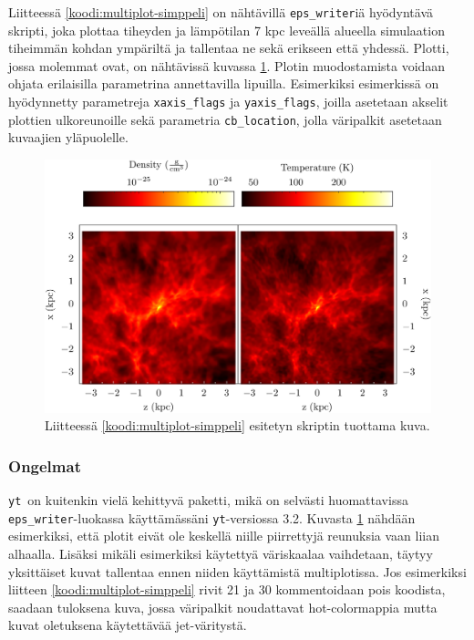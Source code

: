 \documentclass[12pt,a4paper]{article}
\newcommand{\yt}{\texttt{yt}}
\begin{document}
Liitteessä \ref{koodi:multiplot-simppeli} on nähtävillä \texttt{eps\_writer}iä hyödyntävä skripti, joka plottaa tiheyden ja lämpötilan 7 kpc leveällä alueella simulaation tiheimmän kohdan ympäriltä ja tallentaa ne sekä erikseen että yhdessä. Plotti, jossa molemmat ovat, on nähtävissä kuvassa \ref{fig:multiplot-simppeli}. Plotin muodostamista voidaan ohjata erilaisilla parametrina annettavilla lipuilla. Esimerkiksi esimerkissä on hyödynnetty parametreja \texttt{xaxis\_flags} ja \texttt{yaxis\_flags}, joilla asetetaan akselit plottien ulkoreunoille sekä parametria \texttt{cb\_location}, jolla väripalkit asetetaan kuvaajien yläpuolelle.

\begin{figure}
   \centering
   \includegraphics[width=\textwidth]{../kuvat/EPSMultiPlot.png}
   \caption{Liitteessä \ref{koodi:multiplot-simppeli} esitetyn skriptin tuottama kuva.} \label{fig:multiplot-simppeli}
\end{figure}

\subsubsection{Ongelmat}
\yt\ on kuitenkin vielä kehittyvä paketti, mikä on selvästi huomattavissa \texttt{eps\_writer}-luokassa käyttämässäni \yt -versiossa 3.2. Kuvasta \ref{fig:multiplot-simppeli} nähdään esimerkiksi, että plotit eivät ole keskellä niille piirrettyjä reunuksia vaan liian alhaalla. Lisäksi mikäli esimerkiksi käytettyä väriskaalaa vaihdetaan, täytyy yksittäiset kuvat tallentaa ennen niiden käyttämistä multiplotissa. Jos esimerkiksi liitteen \ref{koodi:multiplot-simppeli} rivit 21 ja 30 kommentoidaan pois koodista, saadaan tuloksena kuva, jossa väripalkit noudattavat hot-colormappia mutta kuvat oletuksena käytettävää jet-väritystä.
\end{document}
